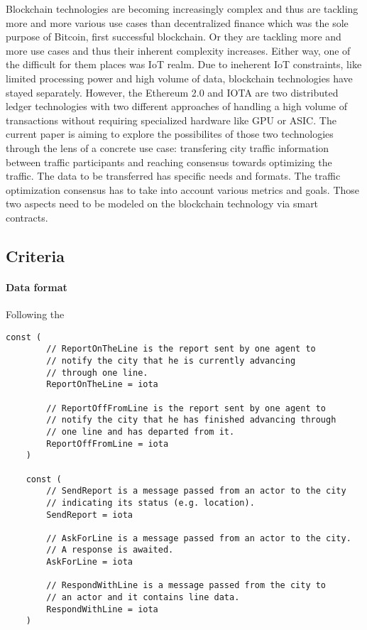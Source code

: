 \documentclass[conference]{IEEEtran}
\begin{document}
    Blockchain technologies are becoming increasingly complex and thus are tackling more and more various use cases than decentralized finance which was the sole purpose of Bitcoin, first successful blockchain. Or they are tackling more and more use cases and thus their inherent complexity increases. Either way, one of the difficult for them places was IoT realm. Due to ineherent IoT constraints, like limited processing power and high volume of data, blockchain technologies have stayed separately. However, the Ethereum 2.0 and IOTA are two distributed ledger technologies with two different approaches of handling a high volume of transactions without requiring specialized hardware like GPU or ASIC. The current paper is aiming to explore the possibilites of those two technologies through the lens of a concrete use case: transfering city traffic information between traffic participants and reaching consensus towards optimizing the traffic. The data to be transferred has specific needs and formats. The traffic optimization consensus has to take into account various metrics and goals. Those two aspects need to be modeled on the blockchain technology via smart contracts.

\subsection{Criteria}
\paragraph{Data format}

Following the 
\begin{lstlisting}[caption=Go enumerations for messaging, label=lst:goactorreports]
    const (   
        // ReportOnTheLine is the report sent by one agent to
        // notify the city that he is currently advancing
        // through one line.
        ReportOnTheLine = iota
        
        // ReportOffFromLine is the report sent by one agent to
        // notify the city that he has finished advancing through
        // one line and has departed from it.
        ReportOffFromLine = iota
    )
        
    const (
        // SendReport is a message passed from an actor to the city
        // indicating its status (e.g. location).
        SendReport = iota
        
        // AskForLine is a message passed from an actor to the city.
        // A response is awaited.
        AskForLine = iota
        
        // RespondWithLine is a message passed from the city to
        // an actor and it contains line data.
        RespondWithLine = iota
    )
    \end{lstlisting}
\end{document}
